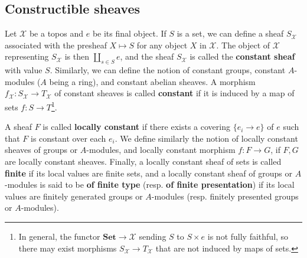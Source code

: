 \subsection{Constructible sheaves}
Let $\mathcal{X}$ be a topos and $e$ be its final object. If $S$ is a set, we can define a sheaf $S_\mathcal{X}$ associated with the presheaf $X\mapsto S$ for any object $X$ in $\mathcal{X}$. The object of $\mathcal{X}$ representing $S_\mathcal{X}$ is then $\coprod_{s\in S}e$, and the sheaf $S_\mathcal{X}$ is called the \textbf{constant sheaf} with value $S$. Similarly, we can define the notion of constant groups, constant $A$-modules ($A$ being a ring), and constant abelian sheaves. A morphism $f_\mathcal{X}:S_\mathcal{X}\to T_\mathcal{X}$ of constant sheaves is called \textbf{constant} if it is induced by a map of sets $f:S\to T$\footnote{In general, the functor $\mathbf{Set}\to\mathcal{X}$ sending $S$ to $S\times e$ is not fully faithful, so there may exist morphisms $S_\mathcal{X}\to T_\mathcal{X}$ that are not induced by maps of sets.}.\par
A sheaf $F$ is called \textbf{locally constant} if there exists a covering $\{e_i\to e\}$ of $e$ such that $F$ is constant over each $e_i$. We define similarly the notion of locally constant sheaves of groups or $A$-modules, and locally constant morphism $f:F\to G$, if $F,G$ are locally constant sheaves. Finally, a locally constant sheaf of sets is called \textbf{finite} if its local values are finite sets, and a locally constant sheaf of groups or $A$-modules is said to be \textbf{of finite type} (resp. \textbf{of finite presentation}) if its local values are finitely generated groups or $A$-modules (resp. finitely presented groups or $A$-modules).

